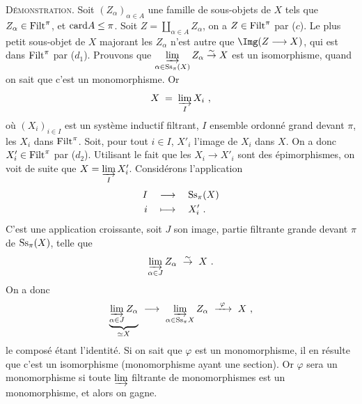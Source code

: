 \textsc{Démonstration}. Soit $(Z_{\alpha})_{\alpha\in A}$ une famille de sous-objets de $X$ tels que $Z_{\alpha} \in \mathrm{Filt}^{\pi}$, et $\mathrm{card} A \leq \pi$. Soit $Z = \coprod_{\alpha\in A} Z_{\alpha}$, on a $Z \in \mathrm{Filt}^{\pi}$ par ($c$). Le plus petit sous-objet de $X$ majorant les $Z_{\alpha}$ n'est autre que $\Img (Z \longrightarrow X)$, qui est dans $\mathrm{Filt}^{\pi}$ par ($d_1$). Prouvons que $\varinjlim\limits_{\alpha\in\mathrm{Ss}_{\pi}(X)} Z_{\alpha} \overset{\sim}{\to} X$ est un isomorphisme, quand on sait que c'est un monomorphisme. Or
\[
X \;=\; \varinjlim_{I} X_i \ ,
\]
où $(X_i)_{i\in I}$ est un système inductif filtrant, $I$ ensemble ordonné grand devant $\pi$, les $X_i$ dans $\mathrm{Filt}^{\pi}$. Soit, pour tout $i \in I$, $X'_i$ l'image de $X_i$ dans $X$. On a donc $X'_i \in \mathrm{Filt}^{\pi}$ par ($d_2$). Utilisant le fait que les $X_i \longrightarrow X'_i$ sont des épimorphismes, on voit de suite que $X = \varinjlim\limits_{I} X'_i$. Considérons l'application
\[
\begin{aligned}
I \quad &\longrightarrow \quad \mathrm{Ss}_{\pi}(X)\\
i \quad &\longmapsto \quad X'_i \ .
\end{aligned}
\]
C'est une application croissante, soit $J$ son image, partie filtrante grande devant $\pi$ de $\mathrm{Ss}_{\pi}(X)$, telle que
\[
\varinjlim_{\alpha\in J} Z_{\alpha} \ \overset{\sim}{\to} \ X \ .
\]
On a donc
\[
\underbrace{\varinjlim_{\alpha\in J} Z_{\alpha}}_{\simeq X} \ \longrightarrow \ \varinjlim_{\alpha\in\Ss_{\pi}X} Z_{\alpha} \ \xrightarrow{\ \varphi\ } \ X \ ,
\]
le composé étant l'identité. Si on sait que $\varphi$ est un monomorphisme, il en résulte que c'est un isomorphisme (monomorphisme ayant une section). Or $\varphi$ sera un monomorphisme si toute $\varinjlim$ filtrante de monomorphismes est un monomorphisme, et alors on gagne.


